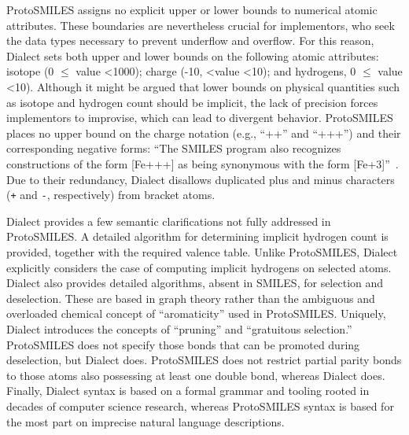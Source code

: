 \documentclass{article}
\def\ttt{\texttt}
\begin{document}
ProtoSMILES assigns no explicit upper or lower bounds to numerical atomic attributes. These boundaries are nevertheless crucial for implementors, who seek the data types necessary to prevent underflow and overflow. For this reason, Dialect sets both upper and lower bounds on the following atomic attributes: isotope (0 $\leq$ value \textless 1000); charge (-10, \textless value \textless 10); and hydrogens, 0 $\leq$ value \textless 10). Although it might be argued that lower bounds on physical quantities such as isotope and hydrogen count should be implicit, the lack of precision forces implementors to improvise, which can lead to divergent behavior. ProtoSMILES places no upper bound on the charge notation (e.g., \enquote{++} and \enquote{+++}) and their corresponding negative forms: \enquote{The SMILES program also recognizes constructions of the form [Fe+++] as being synonymous with the form [Fe+3]}~\cite[p.~32]{weininger:1988}. Due to their redundancy, Dialect disallows duplicated plus and minus characters (\ttt{+} and \ttt{-}, respectively) from bracket atoms.

Dialect provides a few semantic clarifications not fully addressed in ProtoSMILES. A detailed algorithm for determining implicit hydrogen count is provided, together with the required valence table. Unlike ProtoSMILES, Dialect explicitly considers the case of computing implicit hydrogens on selected atoms. Dialect also provides detailed algorithms, absent in SMILES, for selection and deselection. These are based in graph theory rather than the ambiguous and overloaded chemical concept of \enquote{aromaticity} used in ProtoSMILES. Uniquely, Dialect introduces the concepts of \enquote{pruning} and \enquote{gratuitous selection.} ProtoSMILES does not specify those bonds that can be promoted during deselection, but Dialect does. ProtoSMILES does not restrict partial parity bonds to those atoms also possessing at least one double bond, whereas Dialect does. Finally, Dialect syntax is based on a formal grammar and tooling rooted in decades of computer science research, whereas ProtoSMILES syntax is based for the most part on imprecise natural language descriptions.
\end{document}
